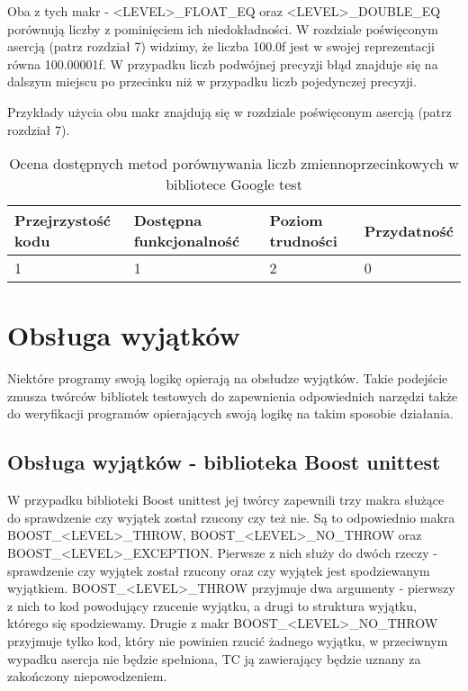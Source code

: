 \documentclass[12pt,a4paper,notitlepage]{report}
\begin{document}
Oba z tych makr - <LEVEL>{\_}FLOAT{\_}EQ oraz <LEVEL>{\_}DOUBLE{\_}EQ porównują liczby z pominięciem ich niedokładności. W rozdziale poświęconym asercją (patrz rozdział 7) widzimy, że liczba 100.0f jest w swojej reprezentacji równa 100.00001f. W przypadku liczb podwójnej precyzji błąd znajduje się na dalszym miejscu po przecinku niż w przypadku liczb pojedynczej precyzji.

Przykłady użycia obu makr znajdują się w rozdziale poświęconym asercją (patrz rozdział 7).

\begin{center}
			\begin{table}[!ht]
			\caption{Ocena dostępnych metod porównywania liczb zmiennoprzecinkowych w bibliotece Google test}
			\label{}
			\begin{tabular}[!hc]{|l|l|l|l|}
		\hline
		Przejrzystość kodu 	&	Dostępna funkcjonalność	&	Poziom trudności	&	Przydatność \\ \hline
		1					&	1						&	2					& 	0  			\\ \hline
			\end{tabular}
			\end{table} 
		\end{center}

\section{Obsługa wyjątków}

Niektóre programy swoją logikę opierają na obsłudze wyjątków. Takie podejście zmusza twórców bibliotek testowych do zapewnienia odpowiednich narzędzi także do weryfikacji programów opierających swoją logikę na takim sposobie działania. 

\subsection{Obsługa wyjątków - biblioteka Boost unittest}

W przypadku biblioteki Boost unittest jej twórcy zapewnili trzy makra służące do sprawdzenie czy wyjątek został rzucony czy też nie. Są to odpowiednio makra BOOST{\_}<LEVEL>{\_}THROW, BOOST{\_}<LEVEL>{\_}NO{\_}THROW oraz BOOST{\_}<LEVEL>{\_}EXCEPTION. Pierwsze z nich służy do dwóch rzeczy - sprawdzenie czy wyjątek został rzucony oraz czy wyjątek jest spodziewanym wyjątkiem. BOOST{\_}<LEVEL>{\_}THROW przyjmuje dwa argumenty - pierwszy z nich to kod powodujący rzucenie wyjątku, a drugi to struktura wyjątku, którego się spodziewamy. 
Drugie z makr BOOST{\_}<LEVEL>{\_}NO{\_}THROW przyjmuje tylko kod, który nie powinien rzucić żadnego wyjątku, w przeciwnym wypadku asercja nie będzie spełniona, TC ją zawierający będzie uznany za zakończony niepowodzeniem.
\end{document}
